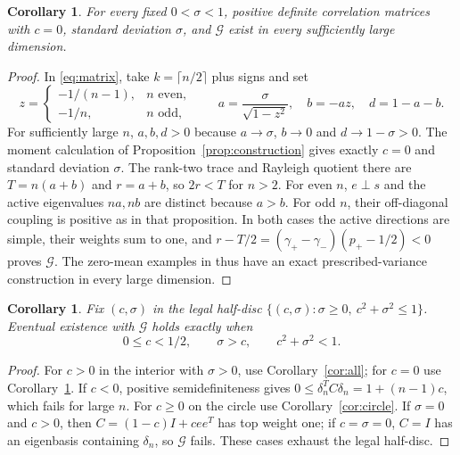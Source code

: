 \documentclass[11pt]{article}
\newtheorem{corollary}[theorem]{Corollary}
\newcommand{\G}{\mathcal G}
\begin{document}
\begin{corollary}\label{cor:zero}
For every fixed $0<\sigma<1$, positive definite correlation matrices
with $c=0$, standard deviation $\sigma$, and $\G$ exist in every
sufficiently large dimension.
\end{corollary}
\begin{proof}
In \eqref{eq:matrix}, take $k=\lceil n/2\rceil$ plus signs and set
\[
 z=\begin{cases}-1/(n-1),&n\text{ even},\\-1/n,&n\text{ odd},\end{cases}
 \qquad a=\frac{\sigma}{\sqrt{1-z^2}},\quad b=-az,\quad d=1-a-b.
\]
For sufficiently large $n$, $a,b,d>0$ because $a\to\sigma$,
$b\to0$ and $d\to1-\sigma>0$. The moment calculation of
Proposition~\ref{prop:construction} gives exactly $c=0$ and
standard deviation $\sigma$. The rank-two trace and Rayleigh
quotient there are $T=n(a+b)$ and $r=a+b$, so $2r<T$ for $n>2$.
For even $n$, $e\perp s$ and the active eigenvalues $na,nb$ are
distinct because $a>b$. For odd $n$, their off-diagonal coupling
is positive as in that proposition. In both cases the active
directions are simple, their weights sum to one, and
$r-T/2=(\gamma_+-\gamma_-)(p_+-1/2)<0$ proves $\G$.
The zero-mean examples in \cite[Section VII, p.~18]{SHG} thus have
an exact prescribed-variance construction in every large dimension.
\end{proof}

\begin{corollary}\label{cor:legal}
Fix $(c,\sigma)$ in the legal half-disc
$\{(c,\sigma):\sigma\ge0,\ c^2+\sigma^2\le1\}$.
Eventual existence with $\G$ holds exactly when
\[
 0\le c<1/2,\qquad \sigma>c,\qquad c^2+\sigma^2<1.
\]
\end{corollary}
\begin{proof}
For $c>0$ in the interior with $\sigma>0$, use
Corollary~\ref{cor:all}; for $c=0$ use Corollary~\ref{cor:zero}.
If $c<0$, positive semidefiniteness gives
$0\le\delta_n^TC\delta_n=1+(n-1)c$, which fails for large $n$.
For $c\ge0$ on the circle use Corollary~\ref{cor:circle}.
If $\sigma=0$ and $c>0$, then
$C=(1-c)I+cee^T$ has top weight one; if $c=\sigma=0$, $C=I$
has an eigenbasis containing $\delta_n$, so $\G$ fails.
These cases exhaust the legal half-disc.
\end{proof}
\end{document}
